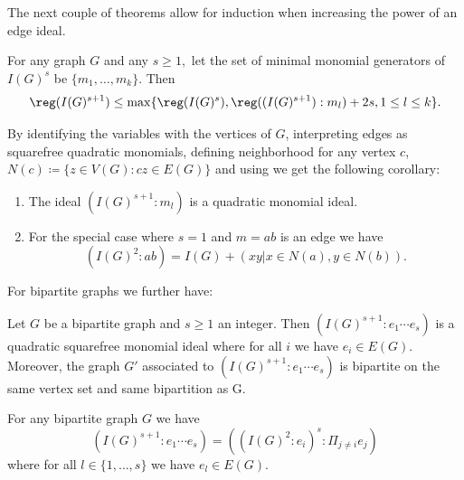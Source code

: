  The next couple of theorems allow for induction when increasing the power of an edge ideal.
 
\begin{theorem}
\label{thm:2.3}
For any graph $G$ and any $s \geq 1,$ let the set of minimal monomial generators of $I(G)^s$ be $\{m_1, \dots, m_k\}.$ Then
$$ \reg (I(G)^{s+1}) \leq \max \{\reg (I(G)^s) , \reg ((I(G)^{s+1}): m_l)+2s , 1 \leq l \leq k\}.$$
\end{theorem}

 By identifying the variables with the vertices of $G$, interpreting edges as squarefree quadratic monomials, defining neighborhood for any vertex $c$,  $N(c)\coloneqq\{z\in V(G): cz \in E(G)\}$ and using  \cite[Thm. 5.2]{banerjee}  we get the following corollary:

\begin{coro}
\begin{enumerate}[label=(\roman*)]
\item The ideal $(I(G)^{s+1}: m_l)$ is a quadratic monomial ideal.
\item For the special case where $s=1$ and $m=ab$ is an edge we have $$(I(G)^2:ab)=I(G)+(xy| x\in N(a),y\in N(b)).$$
\end{enumerate}
\label{cor:I2:e}
\end{coro}

 For bipartite graphs we further have:
\begin{theorem}
Let $G$ be a bipartite graph and $s \geq 1$ an integer. 
Then $(I(G)^{s+1}: e_1 \cdots e_s)$ is a quadratic squarefree monomial ideal where for all $i$ we have $e_i \in E(G)$. Moreover, the graph $G'$ associated to $(I(G)^{s+1} : e_1\cdots e_s)$ is bipartite on the same vertex set and same bipartition as G.

 For any bipartite graph $G$ we have $$(I(G)^{s+1}:e_1\cdots e_s)=((I(G)^2:e_i)^s : \Pi_{j \neq i} e_j)$$ where for all $l \in \{1, \ldots,s\}$ we have $e_l \in E(G)$.
 \label{thm:2.5}
\end{theorem}

